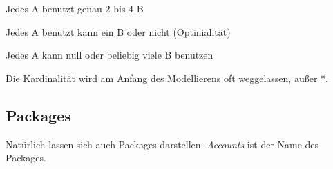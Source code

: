 \documentclass[12pt, oneside]{article}   	%
\begin{document}
\begin{center}
Jedes A benutzt genau $2$ bis $4$ B \\ \vspace{0.5cm}
\end{center}

\begin{center}
Jedes A benutzt kann ein B oder nicht (Optinialit\"at) \\ \vspace{0.5cm}
\end{center}

\begin{center}
Jedes A kann null oder beliebig viele B benutzen \\ \vspace{0.5cm}
\end{center}

Die Kardinalit\"at wird am Anfang des Modellierens oft weggelassen, au\ss{}er *.

\subsection{Packages}
Nat\"urlich lassen sich auch Packages darstellen. \textit{Accounts} ist der Name des Packages.
\end{document}
